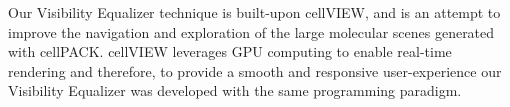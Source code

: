 Our Visibility Equalizer technique is built-upon cellVIEW, and is an attempt to improve the navigation and exploration of the large molecular scenes generated with cellPACK. cellVIEW leverages GPU computing to enable real-time rendering and therefore, to provide a smooth and responsive user-experience our Visibility Equalizer was developed with the same programming paradigm.


